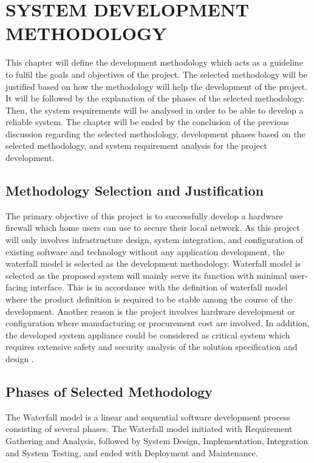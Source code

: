 \documentclass[../index.tex]{subfiles}
\begin{document}
\chapter{SYSTEM DEVELOPMENT METHODOLOGY}

This chapter will define the development methodology which acts as a guideline to fulfil the goals
and objectives of the project. The selected methodology will be justified based on how the
methodology will help the development of the project. It will be followed by the explanation of the
phases of the selected methodology. Then, the system requirements will be analysed in order to be
able to develop a reliable system. The chapter will be ended by the conclusion of the previous
discussion regarding the selected methodology, development phases based on the selected methodology,
and system requirement analysis for the project development.

\section{Methodology Selection and Justification}

The primary objective of this project is to successfully develop a hardware firewall which home
users can use to secure their local network. As this project will only involves infrastructure
design, system integration, and configuration of existing software and technology without any
application development, the waterfall model is selected as the development methodology. Waterfall
model is selected as the proposed system will mainly serve its function with minimal user-facing
interface. This is in accordance with the definition of waterfall model where the product definition
is required to be stable among the course of the development. Another reason is the project involves
hardware development or configuration where manufacturing or procurement cost are involved. In
addition, the developed system appliance could be considered as critical system which requires
extensive safety and security analysis of the solution specification and design \cite{Balaji_2012}.

\section{Phases of Selected Methodology}

The Waterfall model is a linear and sequential software development process consisting of several
phases. The Waterfall model initiated with Requirement Gathering and Analysis, followed by System
Design, Implementation, Integration and System Testing, and ended with Deployment and Maintenance.
\end{document}
